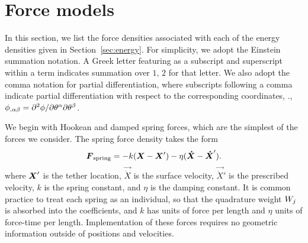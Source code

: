 \section{Force models}\label{sec:forces}
In this section, we list the force densities associated with each of the energy densities
given in Section~\ref{sec:energy}. For simplicity, we adopt the Einstein summation
notation. A Greek letter featuring as a subscript and superscript within a term indicates
summation over ${1,\,2}$ for that letter. We also adopt the comma notation for partial
differentiation, where subscripts following a comma indicate partial differentiation with
respect to the corresponding coordinates, .,
$\phi_{,\alpha\beta} = \partial^2\phi/\partial\q[\alpha]\partial\q[\beta]$.

We begin with Hookean and damped spring forces, which are the simplest of the forces we
consider. The spring force density takes the form
\begin{equation}
    \boldsymbol{F}_\text{spring} = -k (\boldsymbol{X} - \boldsymbol{X}') - \eta(\boldsymbol{\dot{X}}-\boldsymbol{\dot{X}}').
\end{equation}
where $\boldsymbol{X}'$ is the tether location, $\vec{\dot{X}}$ is the surface velocity,
$\vec{\dot{X}}'$ is the prescribed velocity, $k$ is the spring constant, and $\eta$ is
the damping constant.  It is common practice to treat each spring as an individual, so
that the quadrature weight $\weight[j]$ is absorbed into the coefficients, and $k$ has
units of force per length and $\eta$ units of force-time per length. Implementation of
these forces requires no geometric information outside of positions and velocities.

